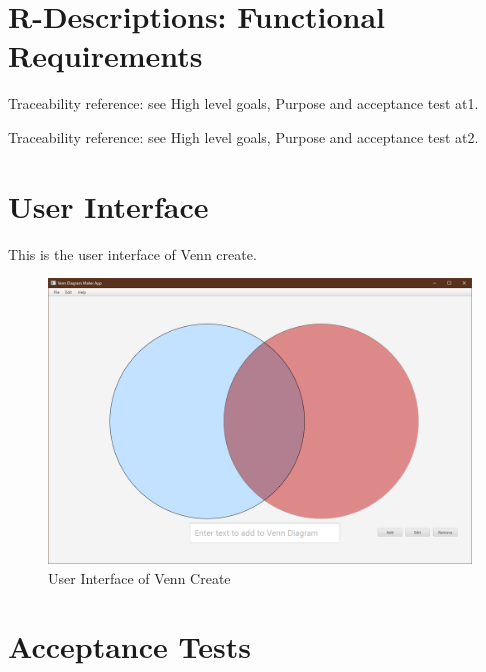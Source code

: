 \documentclass[fontsize=12pt,paper=letter,twoside]{scrartcl}
\begin{document}
\newpage

\section{R-Descriptions: Functional Requirements}

{Traceability reference: see High level goals, Purpose and acceptance test at1.}

{Traceability reference: see High level goals, Purpose and acceptance test at2.}

\newpage
\section{User Interface}

This is the user interface of Venn create.

\begin{figure}[hbt]
	\includegraphics[width=\textwidth]{images/user-interface.png}
	\caption{User Interface of Venn Create}
\end{figure}

\newpage
\section{Acceptance Tests}
\end{document}
